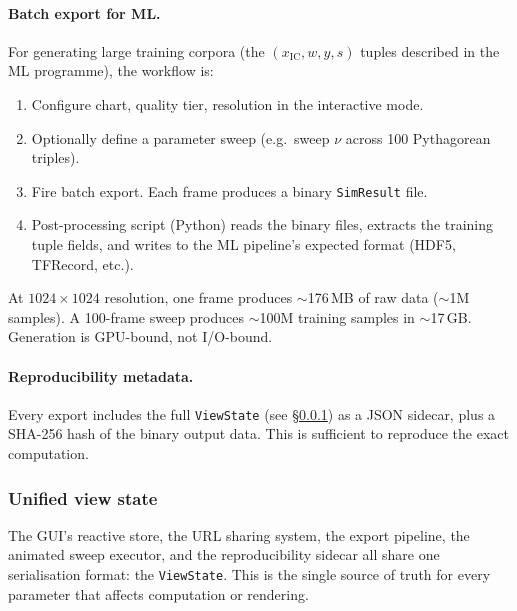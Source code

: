 \documentclass[11pt]{report}
\begin{document}
\paragraph{Batch export for ML.} For generating large training corpora (the $(x_{\mathrm{IC}}, w, y, s)$ tuples described in the ML programme), the workflow is:
\begin{enumerate}[nosep]
\item Configure chart, quality tier, resolution in the interactive mode.
\item Optionally define a parameter sweep (e.g.\ sweep $\nu$ across 100 Pythagorean triples).
\item Fire batch export. Each frame produces a binary \texttt{SimResult} file.
\item Post-processing script (Python) reads the binary files, extracts the training tuple fields, and writes to the ML pipeline's expected format (HDF5, TFRecord, etc.).
\end{enumerate}
At $1024\times 1024$ resolution, one frame produces $\sim$176\,MB of raw data ($\sim$1M samples). A 100-frame sweep produces $\sim$100M training samples in $\sim$17\,GB. Generation is GPU-bound, not I/O-bound.

\paragraph{Reproducibility metadata.} Every export includes the full \texttt{ViewState} (see \S\ref{sec:view_state}) as a JSON sidecar, plus a SHA-256 hash of the binary output data. This is sufficient to reproduce the exact computation.


\subsubsection{Unified view state}
\label{sec:view_state}

The GUI's reactive store, the URL sharing system, the export pipeline, the animated sweep executor, and the reproducibility sidecar all share one serialisation format: the \texttt{ViewState}. This is the single source of truth for every parameter that affects computation or rendering.
\end{document}

